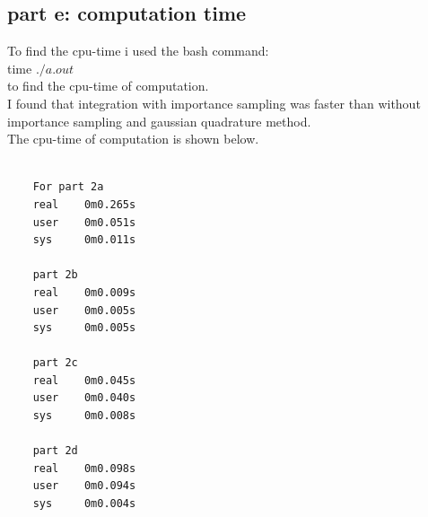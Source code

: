 \documentclass[11pt,a4paper,english]{article}
\begin{document}
	\subsection{part e: computation time}
	To find the cpu-time i used the bash command:\\
	time $./a.out$\\
	to find the cpu-time of computation.\\
	I found that integration with importance sampling was faster
	than without importance sampling and gaussian quadrature method.\\
	The cpu-time of computation is shown below.
	
	\begin{verbatim}
	
	For part 2a	 
    real	0m0.265s
    user	0m0.051s
    sys	    0m0.011s
    
    part 2b       
    real	0m0.009s
    user	0m0.005s
    sys	    0m0.005s
    
    part 2c
    real	0m0.045s
    user	0m0.040s
    sys	    0m0.008s
    
    part 2d
    real	0m0.098s
    user	0m0.094s
    sys	    0m0.004s
	
	\end{verbatim} 
    
\end{document}
